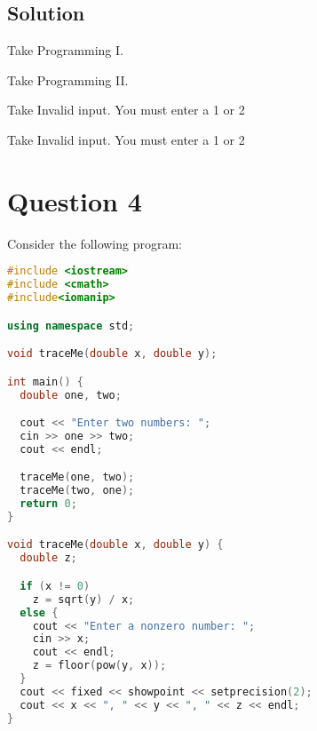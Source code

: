 \documentclass[a4paper, 11pt]{article}
\begin{document}
    \subsection{Solution}
      \begin{enumerate}[label=\alph*.]
        \begin{minipage}{0.45\textwidth}
          \item \begin{mdframed}[style=AnswerFrame]
            Take Programming I.
            \end{mdframed}
          \item \begin{mdframed}[style=AnswerFrame]
            Take Programming II.
            \end{mdframed}
        \end{minipage}\hfill
        \begin{minipage}{.45\textwidth}
          \item \begin{mdframed}[style=AnswerFrame]
            Take Invalid input. You must enter a 1 or 2
            \end{mdframed}
          \item \begin{mdframed}[style=AnswerFrame]
            Take Invalid input. You must enter a 1 or 2
            \end{mdframed}
        \end{minipage}
      \end{enumerate}


  \newpage
  \section{Question 4}
    Consider the following program:

    \begin{lstlisting}[language=c++,caption={Question 4 Problem}]
#include <iostream>
#include <cmath>
#include<iomanip>

using namespace std;

void traceMe(double x, double y);

int main() {
  double one, two;

  cout << "Enter two numbers: ";
  cin >> one >> two;
  cout << endl;

  traceMe(one, two);
  traceMe(two, one);
  return 0;
}

void traceMe(double x, double y) {
  double z;

  if (x != 0)
    z = sqrt(y) / x;
  else {
    cout << "Enter a nonzero number: ";
    cin >> x;
    cout << endl;
    z = floor(pow(y, x));
  }
  cout << fixed << showpoint << setprecision(2);
  cout << x << ", " << y << ", " << z << endl;
}
    \end{lstlisting}
\end{document}
